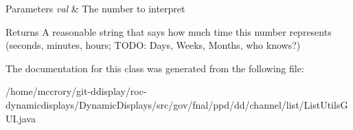 \begin{DoxyParams}{Parameters}
{\em val} & The number to interpret \\
\hline
\end{DoxyParams}
\begin{DoxyReturn}{Returns}
A reasonable string that says how much time this number represents (seconds, minutes, hours; T\-O\-D\-O\-: Days, Weeks, Months, who knows?) 
\end{DoxyReturn}


The documentation for this class was generated from the following file\-:\begin{DoxyCompactItemize}
\item 
/home/mccrory/git-\/ddisplay/roc-\/dynamicdisplays/\-Dynamic\-Displays/src/gov/fnal/ppd/dd/channel/list/List\-Utils\-G\-U\-I.\-java\end{DoxyCompactItemize}
